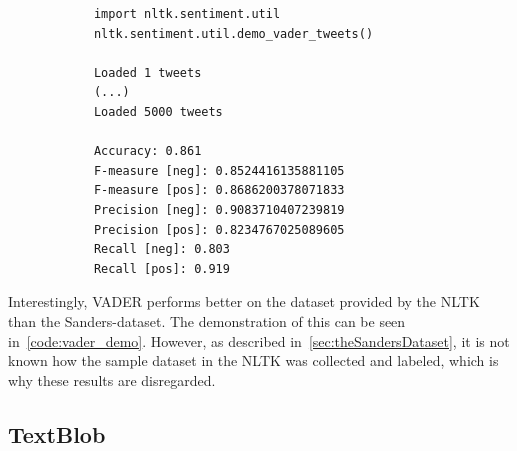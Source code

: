 \begin{table}[t]
    \begin{minipage}[t]{.4\textwidth }
        \caption{F-measure, precision and recall of VADER}
        \label{tab:vader_results}
        \vspace{1.5mm} %
    \end{minipage}%
    \hfill
    \begin{minipage}[t]{.55\textwidth}
        \label{code:vader_demo}
        \begin{verbatim}
            import nltk.sentiment.util
            nltk.sentiment.util.demo_vader_tweets()

            Loaded 1 tweets
            (...)
            Loaded 5000 tweets

            Accuracy: 0.861
            F-measure [neg]: 0.8524416135881105
            F-measure [pos]: 0.8686200378071833
            Precision [neg]: 0.9083710407239819
            Precision [pos]: 0.8234767025089605
            Recall [neg]: 0.803
            Recall [pos]: 0.919
        \end{verbatim}
    \end{minipage}
\end{table}

Interestingly, VADER performs better on the dataset provided by the NLTK than the Sanders-dataset.
The demonstration of this can be seen in~\cref{code:vader_demo}.
However, as described in~\cref{sec:theSandersDataset}, it is not known how the sample dataset in the NLTK was collected and labeled,
which is why these results are disregarded.

\subsection{TextBlob}
\label{subsec:textblob}


